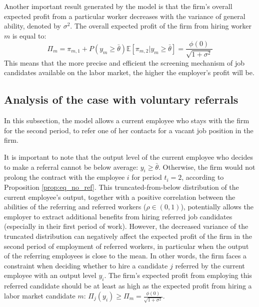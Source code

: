 \documentclass[12pt]{article}
\begin{document}
Another important result generated by the model is that the firm's overall expected profit from a particular worker decreases with the variance of general ability, denoted by $\sigma^2$. The overall expected profit of the firm from hiring worker $m$ is equal to:
\begin{equation}\label{eq_Pi_m}
    \Pi_m = \pi_{m,1}+P(y_m \geq \bar{\theta})\mathbb{E}\left[\pi_{m,2}|y_m \geq \bar{\theta}\right] = \frac{\phi(0)}{\sqrt{1+\sigma^2}}
\end{equation}
This means that the more precise and efficient the screening mechanism of job candidates available on the labor market, the higher the employer's profit will be.

\subsection{Analysis of the case with voluntary referrals}

In this subsection, the model allows a current employee who stays with the firm for the second period, to refer one of her contacts for a vacant job position in the firm. 

It is important to note that the output level of the current employee who decides to make a referral cannot be below average: $y_i \geq \bar{\theta}$. Otherwise, the firm would not prolong the contract with the employee $i$ for period $t_i = 2$, according to Proposition \ref{prop:eq_no_ref}. This truncated-from-below distribution of the current employee's output, together with a positive correlation between the abilities of the referring and referred workers ($\rho \in (0,1)$), potentially allows the employer to extract additional benefits from hiring referred job candidates (especially in their first period of work). However, the decreased variance of the truncated distribution can negatively affect the expected profit of the firm in the second period of employment of referred workers, in particular when the output of the referring employees is close to the mean. In other words, the firm faces a constraint when deciding whether to hire a candidate $j$ referred by the current employee with an output level $y_i$. The firm's expected profit from employing this referred candidate should be at least as high as the expected profit from hiring a labor market candidate $m$: $\Pi_j (y_i) \geq \Pi_m = \frac{\phi(0)}{\sqrt{1+\sigma^2}}$.
\end{document}
